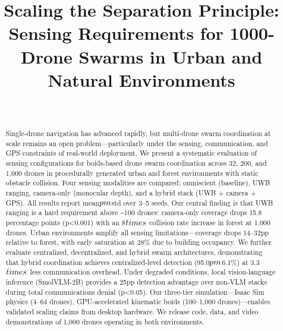 \documentclass[conference]{IEEEtran}
\begin{document}
\title{Scaling the Separation Principle: Sensing Requirements for 1000-Drone Swarms in Urban and Natural Environments}

\author{\\
}

\maketitle

\begin{abstract}
Single-drone navigation has advanced rapidly, but multi-drone
swarm coordination at scale remains an open problem---particularly under
the sensing, communication, and GPS constraints of real-world
deployment. We present a systematic evaluation of sensing configurations
for boids-based drone swarm coordination across 32, 200, and 1,000
drones in procedurally generated urban and forest environments with
static obstacle collision. Four sensing modalities are compared:
omniscient (baseline), UWB ranging, camera-only (monocular depth), and a
hybrid stack (UWB + camera + GPS). All results report mean$\\pm$std over 3--5
seeds. Our central finding is that UWB ranging is a hard requirement
above \textasciitilde100 drones: camera-only coverage drops 15.8
percentage points (p\textless0.001) with an 8$\\times$ collision rate increase
in forest at 1,000 drones. Urban environments amplify all sensing
limitations---coverage drops 14--32pp relative to forest, with early
saturation at 28\% due to building occupancy. We further evaluate
centralized, decentralized, and hybrid swarm architectures,
demonstrating that hybrid coordination achieves centralized-level
detection (95.0$\\pm$6.1\%) at 3.3$\\times$ less communication overhead. Under
degraded conditions, local vision-language inference (SmolVLM-2B)
provides a 25pp detection advantage over non-VLM stacks during total
communications denial (p\textless0.05). Our three-tier
simulation---Isaac Sim physics (4--64 drones), GPU-accelerated kinematic
boids (100--1,000 drones)---enables validated scaling claims from
desktop hardware. We release code, data, and video demonstrations of
1,000 drones operating in both environments.
\end{abstract}
\end{document}
